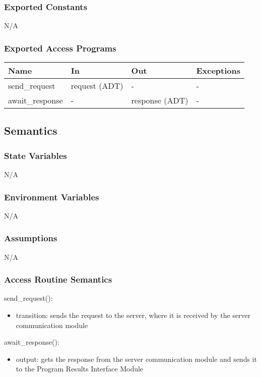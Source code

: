 \documentclass[12pt, titlepage]{article}
\begin{document}
\subsubsection{Exported Constants}
N/A

\subsubsection{Exported Access Programs}

\begin{center}
\begin{tabular}{p{3cm} p{4cm} p{4cm} p{2cm}}
\hline
\textbf{Name} & \textbf{In} & \textbf{Out} & \textbf{Exceptions}\\
\hline%
send\_request & request (ADT) &- &-\\
await\_response &- &response (ADT) &-\\
\hline
\end{tabular}
\end{center}

\subsection{Semantics}

\subsubsection{State Variables}
N/A

\subsubsection{Environment Variables}
N/A

\subsubsection{Assumptions}
N/A

\subsubsection{Access Routine Semantics}

\noindent send\_request():
\begin{itemize}
\item transition: sends the request to the server, where it is received by the server communication module 
\end{itemize}
\noindent await\_response():
\begin{itemize} 
  \item output: gets the response from the server communication module and sends it to the Program Results Interface Module  
\end{itemize}
\end{document}
